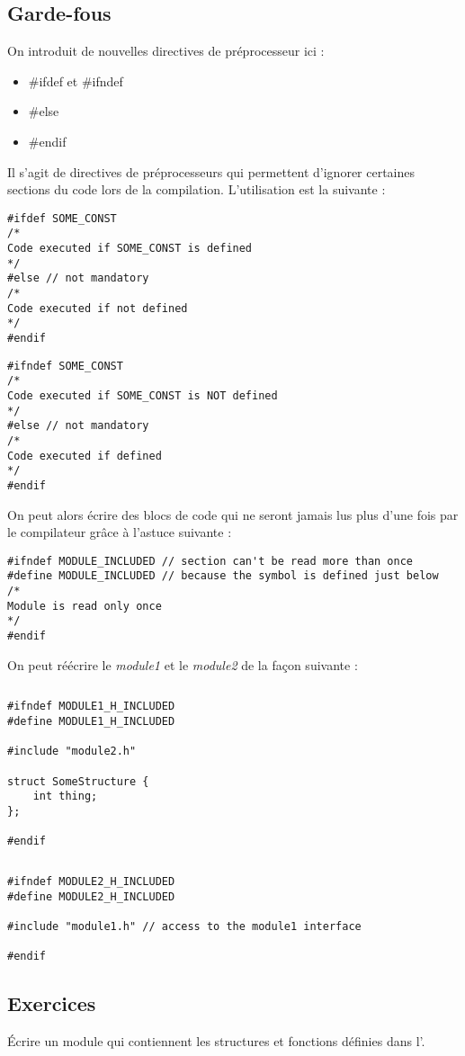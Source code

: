 \documentclass[../../../main.tex]{subfiles}
\begin{document}
\subsection{Garde-fous}
On introduit de nouvelles directives de préprocesseur ici : 
\begin{itemize}
	\item \textsf{\#ifdef} et \textsf{\#ifndef}
	\item \textsf{\#else}
	\item \textsf{\#endif}
\end{itemize}
Il s'agit de directives de préprocesseurs qui permettent d'ignorer certaines sections du code lors de la compilation. L'utilisation est la suivante :

\begin{minipage}{0.5\textwidth}
	\begin{verbatim}
#ifdef SOME_CONST
/*
Code executed if SOME_CONST is defined
*/
#else // not mandatory
/*
Code executed if not defined
*/
#endif
\end{verbatim}
\end{minipage}
\begin{minipage}{0.5\textwidth}
\begin{verbatim}
#ifndef SOME_CONST
/*
Code executed if SOME_CONST is NOT defined
*/
#else // not mandatory
/*
Code executed if defined
*/
#endif
\end{verbatim}
\end{minipage}

On peut alors écrire des blocs de code qui ne seront jamais lus plus d'une fois par le compilateur grâce à l'astuce suivante :
\begin{verbatim}
#ifndef MODULE_INCLUDED // section can't be read more than once
#define MODULE_INCLUDED // because the symbol is defined just below
/*
Module is read only once
*/
#endif
\end{verbatim}
On peut réécrire le \textit{module1} et le \textit{module2} de la façon suivante :
\begin{lstlisting}[title=module1.h]
\end{lstlisting}
\begin{verbatim}
#ifndef MODULE1_H_INCLUDED
#define MODULE1_H_INCLUDED

#include "module2.h"

struct SomeStructure {
	int thing;
};

#endif
\end{verbatim}
\begin{lstlisting}[title=module2.h]
\end{lstlisting}
\begin{verbatim}
#ifndef MODULE2_H_INCLUDED
#define MODULE2_H_INCLUDED

#include "module1.h" // access to the module1 interface

#endif
\end{verbatim}
\subsection{Exercices}
 Écrire un module qui contiennent les structures et fonctions définies dans l'.
\end{document}
